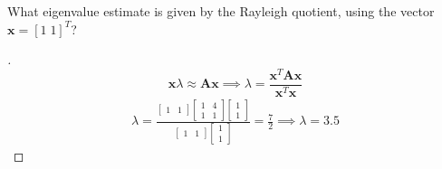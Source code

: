 \documentclass[12pt]{article}
\newenvironment{exercise}[2][Exercise]{\begin{trivlist}
\item[\hskip \labelsep {\bfseries #1}\hskip \labelsep {\bfseries #2.}]}{\end{trivlist}}
\begin{document}
\begin{exercise}{7}
	What eigenvalue estimate is given by the Rayleigh quotient, using the vector $\bm{x} = [1\;1]^T$?
\end{exercise}
\begin{proof}[]
	\vspace{-7mm}
	\[ \bm{x} \lambda \approx \bm{Ax} \implies \lambda = \frac{\bm{x}^T \bm{A x}}{\bm{x}^T \bm{x}} \]
	\begin{align*}
		\lambda =
			\frac{\begin{bmatrix} 1 & 1 \end{bmatrix} \begin{bmatrix} 1 & 4 \\ 1 & 1 \end{bmatrix} \begin{bmatrix} 1 \\ 1 \end{bmatrix}}{\begin{bmatrix} 1 & 1 \end{bmatrix} \begin{bmatrix}1 \\ 1 \end{bmatrix}}
		= \frac{7}{2} \implies \boxed{\lambda = 3.5}
	\end{align*}
\end{proof}
\end{document}
